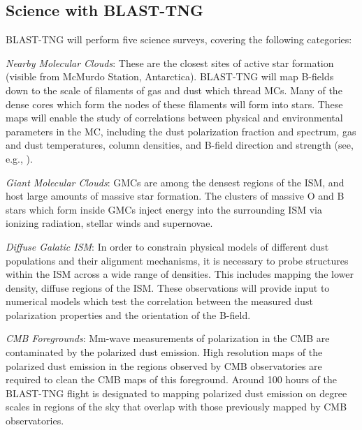 \subsection{Science with BLAST-TNG}

BLAST-TNG will perform five science surveys, covering the following categories:

\vspace{5mm}

\textit{Nearby Molecular Clouds}: These are the closest sites of active star formation (visible from McMurdo Station, Antarctica). BLAST-TNG will map B-fields down to the scale of filaments of gas and dust which thread MCs. Many of the dense cores which form the nodes of these filaments will form into stars. These maps will enable the study of correlations between physical and environmental parameters in the MC, including the dust polarization fraction and spectrum, gas and dust temperatures, column densities, and B-field direction and strength (see, e.g., \citet{galitzki2014balloon,fissel2016balloon,fissel2018relative,shariff2019submillimeter,gandilo2016submillimeter}).

\vspace{5mm}

\textit{Giant Molecular Clouds}: GMCs are among the densest regions of the ISM, and host large amounts of massive star formation. The clusters of massive O and B stars which form inside GMCs inject energy into the surrounding ISM via ionizing radiation, stellar winds and supernovae.
\vspace{5mm}

\textit{Diffuse Galatic ISM}: In order to constrain physical models of different dust populations and their alignment mechanisms, it is necessary to probe structures within the ISM across a wide range of densities. This includes mapping the lower density, diffuse regions of the ISM. These observations will provide input to numerical models which test the correlation between the measured dust polarization properties and the orientation of the B-field.

\vspace{5mm}

\textit{CMB Foregrounds}: Mm-wave measurements of polarization in the CMB are contaminated by the polarized dust emission. High resolution maps of the polarized dust emission in the regions observed by CMB observatories are required to clean the CMB maps of this foreground. Around 100 hours of the BLAST-TNG flight is designated to mapping polarized dust emission on degree scales in regions of the sky that overlap with those previously mapped by CMB observatories.


